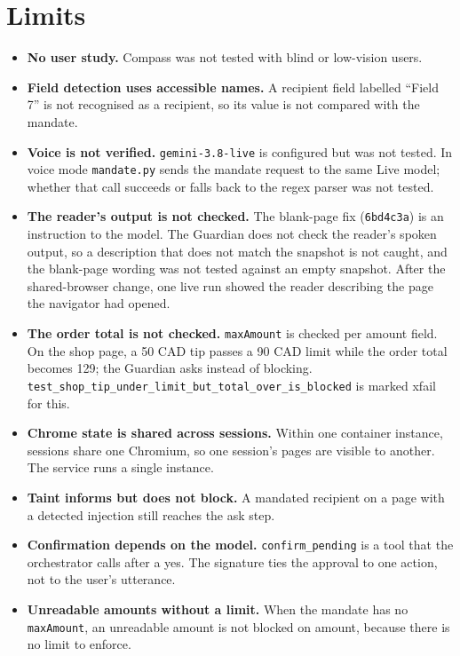 \documentclass[11pt]{article}
\newcommand{\code}[1]{\texttt{#1}}
\begin{document}
\section{Limits}
\label{sec:limits}

\begin{itemize}
\item \textbf{No user study.} Compass was not tested with blind or low-vision users.
\item \textbf{Field detection uses accessible names.} A recipient field labelled ``Field 7'' is not recognised as a recipient, so its value is not compared with the mandate.
\item \textbf{Voice is not verified.} \code{gemini-3.8-live} is configured but was not tested. In voice mode \code{mandate.py} sends the mandate request to the same Live model; whether that call succeeds or falls back to the regex parser was not tested.
\item \textbf{The reader's output is not checked.} The blank-page fix (\code{6bd4c3a}) is an instruction to the model. The Guardian does not check the reader's spoken output, so a description that does not match the snapshot is not caught, and the blank-page wording was not tested against an empty snapshot. After the shared-browser change, one live run showed the reader describing the page the navigator had opened.
\item \textbf{The order total is not checked.} \code{maxAmount} is checked per amount field. On the shop page, a 50 CAD tip passes a 90 CAD limit while the order total becomes 129; the Guardian asks instead of blocking. \code{test\_shop\_tip\_under\_limit\_but\_total\_over\_is\_blocked} is marked xfail for this.
\item \textbf{Chrome state is shared across sessions.} Within one container instance, sessions share one Chromium, so one session's pages are visible to another. The service runs a single instance.
\item \textbf{Taint informs but does not block.} A mandated recipient on a page with a detected injection still reaches the ask step.
\item \textbf{Confirmation depends on the model.} \code{confirm\_pending} is a tool that the orchestrator calls after a yes. The signature ties the approval to one action, not to the user's utterance.
\item \textbf{Unreadable amounts without a limit.} When the mandate has no \code{maxAmount}, an unreadable amount is not blocked on amount, because there is no limit to enforce.

\end{itemize}
\end{document}
